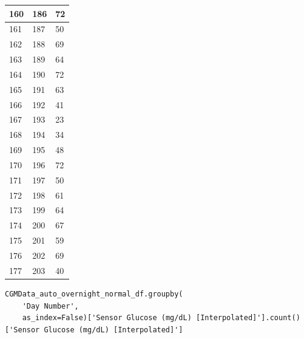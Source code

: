 \begin{tabular}{p{}p{}p{}}
\hline
160 & 186 & 72 \\
\hline
161 & 187 & 50 \\
\hline
162 & 188 & 69 \\
\hline
163 & 189 & 64 \\
\hline
164 & 190 & 72 \\
\hline
165 & 191 & 63 \\
\hline
166 & 192 & 41 \\
\hline
167 & 193 & 23 \\
\hline
168 & 194 & 34 \\
\hline
169 & 195 & 48 \\
\hline
170 & 196 & 72 \\
\hline
171 & 197 & 50 \\
\hline
172 & 198 & 61 \\
\hline
173 & 199 & 64 \\
\hline
174 & 200 & 67 \\
\hline
175 & 201 & 59 \\
\hline
176 & 202 & 69 \\
\hline
177 & 203 & 40 \\
\hline
\bottomrule
\end{tabular}

\bigskip

\begin{verbatim}
CGMData_auto_overnight_normal_df.groupby(
    'Day Number',
    as_index=False)['Sensor Glucose (mg/dL) [Interpolated]'].count()['Sensor Glucose (mg/dL) [Interpolated]']
\end{verbatim}

